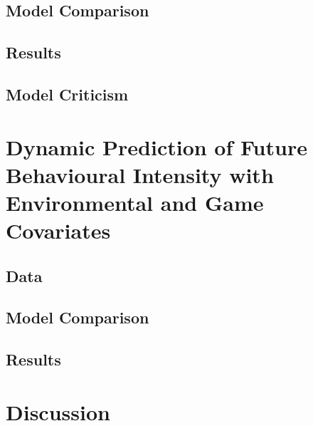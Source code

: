 \subsection{Model Comparison}
\lorem

\subsection{Results}
\lorem

\subsection{Model Criticism}
\lorem

\section{Dynamic Prediction of Future Behavioural Intensity with Environmental and Game Covariates}
\label{model_architecture_1}
\lorem

\subsection{Data}
\lorem

\subsection{Model Comparison}
\lorem

\subsection{Results}
\lorem


\section{Discussion}
\lorem